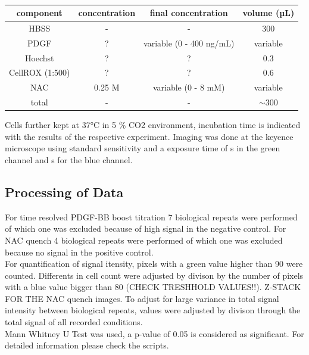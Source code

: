     \begin{table}[h]
    \capstart
    \centering
    \begin{minipage}{\captionwidth}
        \caption[Seahorse Assay]{}
        \label{tab:cellrox_table}
    \end{minipage}
    \begin{tabular}{|c|c|c|c|}
        \hline
        component         & concentration & final concentration      & volume (µL) \\ \hline
        HBSS              & -             & -                        & 300         \\
        PDGF              & ?             & variable (0 - 400 ng/mL) & variable    \\
        Hoechst           & ?             & ?                        & 0.3         \\
        CellROX   (1:500) & ?             & ?                        & 0.6         \\
        NAC               & 0.25 M        & variable (0 - 8 mM)      & variable    \\ \hline
        total             & -             & -                        & $\sim$300   \\ \hline
    \end{tabular}
    \end{table}

    Cells further kept at 37°C in 5 \% CO2 environment, incubation time is indicated with the results of the respective experiment. Imaging was done at the keyence microscope using standard sensitivity and a exposure time of s in the green channel and s for the blue channel.

    \subsection{Processing of Data}
    For time resolved PDGF-BB boost titration 7 biological repeats were performed of which one was excluded because of high signal in the negative control. For NAC quench 4 biological repeats were performed of which one was excluded because no signal in the positive control.\\
    For quantification of signal itensity, pixels with a green value higher than 90 were counted. Differents in cell count were adjusted by divison by the number of pixels with a blue value bigger than 80 (CHECK TRESHHOLD VALUES!!). Z-STACK FOR THE NAC quench images. To adjust for large variance in total signal intensity between biological repeats, values were adjusted by divison through the total signal of all recorded conditions.\\
    Mann Whitney U Test was used, a p-value of 0.05 is considered as significant. For detailed information please check the scripts.


